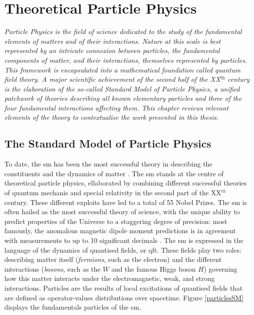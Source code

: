 \chapter{\color{oxfordblue} Theoretical Particle Physics}\label{chap-theory}
\ChapFrame

\textit{Particle Physics is the field of science dedicated to the study of the fundamental elements of matters and of their interactions. Nature at this scale is best represented by an intricate connexion between particles, the fundamental components of matter, and their interactions, themselves represented by particles. This framework is encapsulated into a mathematical foundation called quantum field theory. A major scientific achievement of the second half of the XX$^{\text{th}}$ century is the elaboration of the so-called Standard Model of Particle Physics, a unified patchwork of theories describing all known elementary particles and three of the four fundamental interactions affecting them. This chapter reviews relevant elements of the theory to contextualise the work presented in this thesis.}

\section{The Standard Model of Particle Physics}\label{Section:SM}
To date, the \gls{sm} has been the most successful theory in describing the constituents and the dynamics of matter \cite{SMphysics}. The \gls{sm} stands at the centre of theoretical particle physics, ellaborated by combining different successful theories of quantum mechanis and special relativity in the second part of the XX$^{th}$ century. These different exploits have led to a total of 55 Nobel Prizes. The \gls{sm} is often hailed as the most successful theory of science, with the unique ability to predict properties of the Universe to a staggering degree of precision: most famously, the anomalous magnetic dipole moment predictions is in agreement with measurements to up to 10 significant decimals \cite{PhysRevA.83.052122}. The \gls{sm} is expressed in the language of the dynamics of quantised fields, or \gls{qft}. These fields play two roles: describing matter itself (\textit{fermions}, such as the electron) and the different interactions (\textit{bosons}, such as the $W$ and the famous Higgs boson $H$) governing how this matter interacts under the electromagnetic, weak, and strong interactions. Particles are the results of local excitations of quantised fields that are defined as operator-values distributions over spacetime. Figure \ref{particlesSM} displays the fundamentals particles of the \gls{sm}. \\


